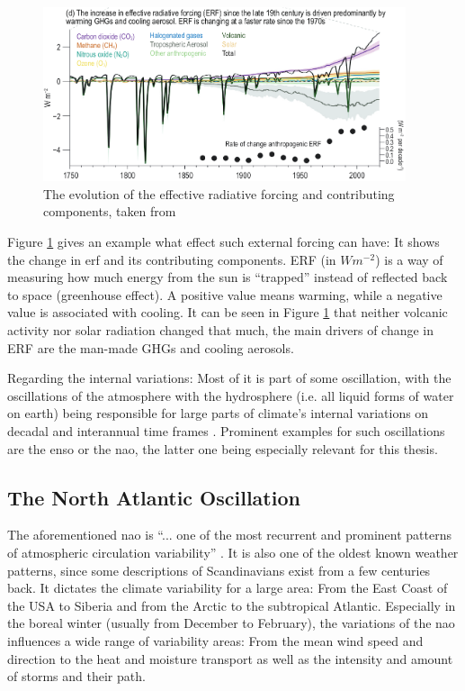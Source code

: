 \begin{figure}[htb]
  \begin{center}
    \includegraphics[width=0.95\textwidth]{figures/ERF_change_with_forcings.png}
  \end{center}
  \caption{The evolution of the effective radiative forcing and contributing components, taken from \cite{intergovernmental_panel_on_climate_change_ipcc_climate_2023}}\label{fig:erf-with-forcings}
\end{figure}

Figure \ref{fig:erf-with-forcings} gives an example what effect such external forcing can have: It shows the change in \ac{erf} and its contributing components. 
ERF (in $Wm^{-2}$) is a way of measuring how much energy from the sun is \enquote{trapped} instead of reflected back to space (greenhouse effect). 
A positive value means warming, while a negative value is associated with cooling. 
It can be seen in Figure \ref{fig:erf-with-forcings} that neither volcanic activity nor solar radiation changed that much, the main drivers of change in ERF are the man-made GHGs and cooling aerosols. \cite{intergovernmental_panel_on_climate_change_ipcc_climate_2023}

Regarding the internal variations: Most of it is part of some oscillation, with the oscillations of the atmosphere with the hydrosphere (i.e. all liquid forms of water on earth) being responsible for large parts of climate's internal variations on decadal and interannual time frames \cite{vietinghoffdiss}. 
Prominent examples for such oscillations are the \ac{enso} or the \ac{nao}, the latter one being especially relevant for this thesis. 


\subsection{The North Atlantic Oscillation}
\label{sec:nao}

The aforementioned \ac{nao} is \enquote{... one of the most recurrent and prominent patterns of atmospheric circulation variability} \cite{hurrell_overview_2003}. 
It is also one of the oldest known weather patterns, since some descriptions of Scandinavians exist from a few centuries back. 
It dictates the climate variability for a large area: From the East Coast of the USA to Siberia and from the Arctic to the subtropical Atlantic. 
Especially in the boreal winter (usually from December to February), the variations of the \ac{nao} influences a wide range of variability areas: From the mean wind speed and direction to the heat and moisture transport as well as the intensity and amount of storms and their path. 

